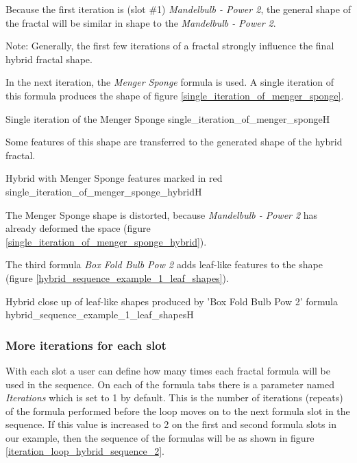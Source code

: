 Because the first iteration is (slot \#1) \emph{Mandelbulb - Power 2}, the general shape
of the fractal will be similar in shape to the \emph{Mandelbulb - Power 2}.

Note: Generally, the first few iterations of a fractal strongly influence the final hybrid fractal shape.

In the next iteration, the \emph{Menger Sponge} formula is used. A single iteration
of this formula produces the shape of figure \ref{single_iteration_of_menger_sponge}.

{Single iteration of the Menger Sponge}
{single_iteration_of_menger_sponge}{H}

Some features of this shape are transferred to the generated shape of the hybrid fractal.

{Hybrid with Menger Sponge features marked in red}
{single_iteration_of_menger_sponge_hybrid}{H}

The Menger Sponge shape is distorted, because \emph{Mandelbulb - Power 2} has
already deformed the space (figure \ref{single_iteration_of_menger_sponge_hybrid}).

The third formula \emph{Box Fold Bulb Pow 2} adds leaf-like features to the shape (figure \ref{hybrid_sequence_example_1_leaf_shapes}).

{Hybrid close up of leaf-like shapes produced by 'Box Fold Bulb Pow 2' formula}
{hybrid_sequence_example_1_leaf_shapes}{H}

\subsubsection{More iterations for each slot}

With each slot a user can define how many times each fractal formula will be used in the sequence.
On each of the formula tabs there is a parameter named \emph{Iterations} which is set to 1 by default.
This is the number of iterations (repeats) of the formula performed before the loop moves on to the next formula slot in the sequence.
If this value is increased to 2 on the first and second formula slots in our example,
then the sequence of the formulas will be as shown in figure \ref{iteration_loop_hybrid_sequence_2}. \label{two-iterations-per-slot}

